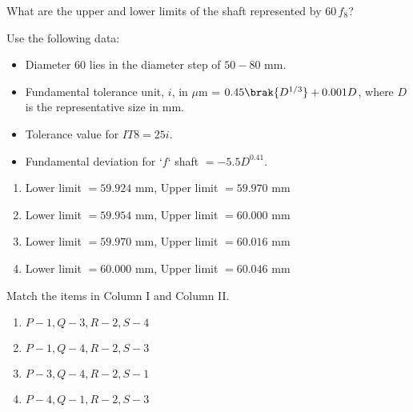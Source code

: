 \iffalse
                       
                        
                        
                        
                    
\author{AI24BTECH11006 - Bugada Roopansha}
\section{me}
\chapter{2009}
\fi
                            
 \item What are the upper and lower limits of the shaft represented by $60 \, f_8$?
    
    Use the following data:
    \begin{itemize}
        \item Diameter $60$ lies in the diameter step of $50 - 80$ mm.
        \item Fundamental tolerance unit, $i$, in $\mu$m = $0.45 \brak{D^{1/3}} + 0.001 D$, where $D$ is the representative size in mm.
        \item Tolerance value for $IT8 = 25i$.
        \item Fundamental deviation for `$f$` shaft $= -5.5 D^{0.41}$.
    \end{itemize}
    
    \begin{enumerate}
        \item Lower limit $= 59.924$ mm, Upper limit $= 59.970$ mm
        \item Lower limit $= 59.954$ mm, Upper limit $= 60.000$ mm
        \item Lower limit $= 59.970$ mm, Upper limit $= 60.016$ mm
        \item Lower limit $= 60.000$ mm, Upper limit $= 60.046$ mm
    \end{enumerate}
    
    \item Match the items in Column I and Column II.
    
    
    
    \begin{enumerate}
        \item $P - 1, Q - 3, R - 2, S - 4$
        \item $P - 1, Q - 4, R - 2, S - 3$
        \item $P - 3, Q - 4, R - 2, S - 1$
        \item $P - 4, Q - 1, R - 2, S - 3$
    \end{enumerate}
  

